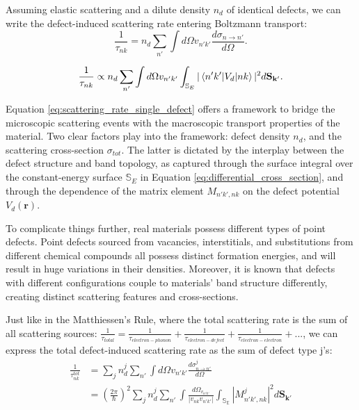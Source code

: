 Assuming elastic scattering and a dilute density $n_d$ of identical defects, we can write the defect-induced scattering rate entering Boltzmann transport: 
\begin{equation}
	\label{eq:scattering_rate_single_defect}
	\frac{1}{\tau_{nk}} = n_d \sum_{n'}\int d\Omega v_{n'k'} \frac{d\sigma_{n\rightarrow n'}}{d\Omega}. 
\end{equation}


\begin{equation}
	\frac{1}{\tau_{nk}} \propto n_d \sum_{n'}\int d\Omega v_{n'k'} \int_{\mathbb{S}_E}|\braket{n'k'|V_d|nk}|^2 {d\mathbf{S_{k'}}}. 
\end{equation}


Equation \ref{eq:scattering_rate_single_defect} offers a framework to bridge the microscopic scattering events with the macroscopic transport properties of the material. Two clear factors play into the framework: defect density $n_d$, and the scattering cross-section $\sigma_{tot}$. The latter is dictated by the interplay between the defect structure and band topology, as captured through the surface integral over the constant-energy surface $\mathbb{S}_E$ in Equation \ref{eq:differential_cross_section}, and through the dependence of the matrix element $M_{n'k',nk}$ on the defect potential $V_d(\mathbf{r})$.

To complicate things further, real materials possess different types of point defects\cite{stuartScanningTunnellingMicroscopy2021}\cite{bertoldoQuantumPointDefects2022}. Point defects sourced from vacancies, interstitials, and substitutions from different chemical compounds all possess distinct formation energies\cite{bertoldoQuantumPointDefects2022}\cite{lopesDefectFormationEnergy2023}, and will result in huge variations in their densities. Moreover, it is known that defects with different configurations couple to materials' band structure differently, creating distinct scattering features and cross-sections\cite{butlerQuasiparticleInterferenceZrSiS2017}\cite{chiSignInversionSuperconducting2014}\cite{derryQuasiparticleInterferenceMagnetic2015a}. 

Just like in the Matthiessen’s Rule, where the total scattering rate is the sum of all scattering sources: $\frac{1}{\tau_{total}} = \frac{1}{\tau_{electron-phonon}} + \frac{1}{\tau_{electron-defect}} + \frac{1}{\tau_{electron-electron}}+...$, we can express the total defect-induced scattering rate as the sum of defect type j's: 
\begin{align}
	\label{eq:scattering_rate_multi_defect1}
	\frac{1}{\tau_{nk}^{tot}} &= \sum_j n_d^j \sum_{n'}\int d\Omega v_{n'k'} \frac{d\sigma^j_{n\rightarrow n'}}{d\Omega}\\
	&= (\frac{2\pi}{\hslash})^2 \sum_j n_d^j \sum_{n'} \int \frac{d\Omega_{v_{n'k'}}}{|v_{nk}v_{n'k'}|}\int_{\mathbb{S_E}}|M_{n'k',nk}^j|^2 d\mathbf{S_{k'}}\label{eq:scattering_rate_multi_defect2}
\end{align}

